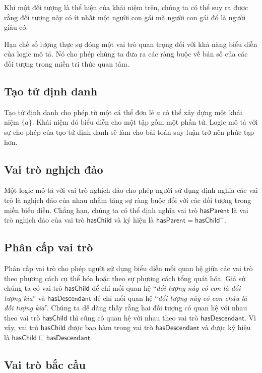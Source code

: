\documentclass[12pt,a4paper]{report}
\begin{document}
Khi một đối tượng là thể hiện của khái niệm trên, chúng ta có thể suy ra được rằng đối tượng này có ít nhất một người con gái mà người con gái đó là người giàu có.

Hạn chế số lượng thực sự đóng một vai trò quan trọng đối với khả năng biểu diễn của logic mô tả. Nó cho phép chúng ta đưa ra các ràng buộc về bản số của các đối tượng trong miền tri thức quan tâm.

\subsection{Tạo tử định danh}
Tạo tử định danh cho phép từ một cá thể đơn lẻ $a$ có thể xây dựng một khái niệm $\{a\}$. Khái niệm đó biểu diễn cho một tập gồm một phần tử. Logic mô tả với sự cho phép của tạo tử định danh sẽ làm cho bài toán suy luận trở nên phức tạp hơn.

\subsection{Vai trò nghịch đảo}\label{subsec:InverseRole}

Một logic mô tả với vai trò nghịch đảo cho phép người sử dụng định nghĩa các vai trò là nghịch đảo của nhau nhằm tăng sự ràng buộc đối với các đối tượng trong miền biểu diễn. Chẳng hạn, chúng ta có thể định nghĩa vai trò $\mathsf{hasParent}$ là vai trò nghịch đảo của vai trò $\mathsf{hasChild}$ và ký hiệu là $\mathsf{hasParent = hasChild^-}$.

\subsection{Phân cấp vai trò}\label{subsec:RoleHierarchy}

Phân cấp vai trò cho phép người sử dụng biểu diễn mối quan hệ giữa các vai trò theo phương cách cụ thể hóa hoặc theo sự phương cách tổng quát hóa. Giả sử chúng ta có vai trò $\mathsf{hasChild}$ để chỉ mối quan hệ ``\textit{đối tượng này có con là đối tượng kia}'' và $\mathsf{hasDescendant}$ để chỉ mối quan hệ ``\textit{đối tượng này có con cháu là đối tượng kia}''. Chúng ta dễ dàng thấy rằng hai đối tượng có quan hệ với nhau theo vai trò $\mathsf{hasChild}$ thì cũng có quan hệ với nhau theo vai trò $\mathsf{hasDescendant}$. Vì vậy, vai trò $\mathsf{hasChild}$ được bao hàm trong vai trò $\mathsf{hasDescendant}$ và được ký hiệu là $\mathsf{hasChild \sqsubseteq hasDescendant}$.

\subsection{Vai trò bắc cầu}\label{subsec:TransitiveRole}
\end{document}
